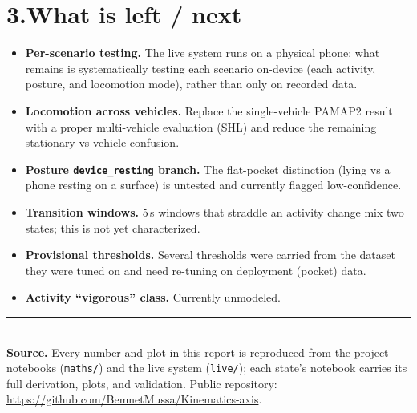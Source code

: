 \documentclass[11pt]{article}
\newcommand{\nb}[1]{\texttt{\footnotesize #1}}
\begin{document}
\section*{3.\quad What is left / next}

\begin{itemize}
  \item \textbf{Per-scenario testing.} The live system runs on a physical phone; what
        remains is systematically testing each scenario on-device (each activity, posture,
        and locomotion mode), rather than only on recorded data.
  \item \textbf{Locomotion across vehicles.} Replace the single-vehicle PAMAP2 result with a
        proper multi-vehicle evaluation (SHL) and reduce the remaining stationary-vs-vehicle
        confusion.
  \item \textbf{Posture \nb{device\_resting} branch.} The flat-pocket distinction (lying vs
        a phone resting on a surface) is untested and currently flagged low-confidence.
  \item \textbf{Transition windows.} 5\,s windows that straddle an activity change mix two
        states; this is not yet characterized.
  \item \textbf{Provisional thresholds.} Several thresholds were carried from the dataset
        they were tuned on and need re-tuning on deployment (pocket) data.
  \item \textbf{Activity ``vigorous'' class.} Currently unmodeled.
\end{itemize}

\vspace{1em}
\noindent\rule{\linewidth}{0.4pt}\\[3pt]
{\footnotesize \textbf{Source.} Every number and plot in this report is reproduced from the
project notebooks (\nb{maths/}) and the live system (\nb{live/}); each state's notebook carries
its full derivation, plots, and validation. Public repository:
\url{https://github.com/BemnetMussa/Kinematics-axis}.}
\end{document}

